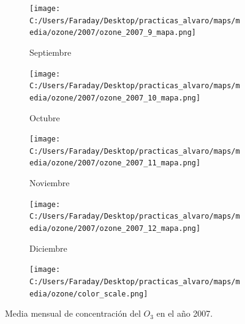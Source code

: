 \documentclass[12pt]{beamer}
\begin{document}
\begin{frame}[squeeze]
\begin{figure}[H]
\begin{subfigure}[H]{0.20\textwidth}
\texttt{[image: C:/Users/Faraday/Desktop/practicas\_alvaro/maps/media/ozone/2007/ozone\_2007\_9\_mapa.png]}
\captionsetup{labelformat=empty}
\caption{\scriptsize Septiembre}
\label{fig:map-ozone-2007-9}
\end{subfigure}
%
\begin{subfigure}[H]{0.20\textwidth}
\texttt{[image: C:/Users/Faraday/Desktop/practicas\_alvaro/maps/media/ozone/2007/ozone\_2007\_10\_mapa.png]}
\captionsetup{labelformat=empty}
\caption{\scriptsize Octubre}
\label{fig:map-ozone-2007-10}
\end{subfigure}
%
\begin{subfigure}[H]{0.20\textwidth}
\texttt{[image: C:/Users/Faraday/Desktop/practicas\_alvaro/maps/media/ozone/2007/ozone\_2007\_11\_mapa.png]}
\captionsetup{labelformat=empty}
\caption{\scriptsize Noviembre}
\label{fig:map-ozone-2007-11}
\end{subfigure}
%
\begin{subfigure}[H]{0.20\textwidth}
\texttt{[image: C:/Users/Faraday/Desktop/practicas\_alvaro/maps/media/ozone/2007/ozone\_2007\_12\_mapa.png]}
\captionsetup{labelformat=empty}
\caption{\scriptsize Diciembre}
\label{fig:map-ozone-2007-12}
\end{subfigure}

\begin{subfigure}[H]{0.45\textwidth}
\texttt{[image: C:/Users/Faraday/Desktop/practicas\_alvaro/maps/media/ozone/color\_scale.png]}
\captionsetup{labelformat=empty}
\caption{}
\end{subfigure}

\vspace*{-7mm}
\caption{\scriptsize Media mensual de concentración del $O_{3}$ en el año 2007.}
\label{fig:map-ozone-2007}
\end{figure}
\end{frame}
\end{document}
